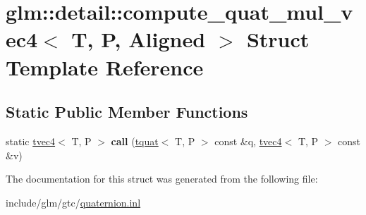 \hypertarget{structglm_1_1detail_1_1compute__quat__mul__vec4}{}\section{glm\+:\+:detail\+:\+:compute\+\_\+quat\+\_\+mul\+\_\+vec4$<$ T, P, Aligned $>$ Struct Template Reference}
\label{structglm_1_1detail_1_1compute__quat__mul__vec4}
\subsection*{Static Public Member Functions}
\begin{DoxyCompactItemize}
\item 
\mbox{\label{structglm_1_1detail_1_1compute__quat__mul__vec4_a38e75c5b7f8f3e588ba90a46b432ac0c}} 
static \hyperlink{structglm_1_1tvec4}{tvec4}$<$ T, P $>$ {\bfseries call} (\hyperlink{structglm_1_1tquat}{tquat}$<$ T, P $>$ const \&q, \hyperlink{structglm_1_1tvec4}{tvec4}$<$ T, P $>$ const \&v)
\end{DoxyCompactItemize}


The documentation for this struct was generated from the following file\+:\begin{DoxyCompactItemize}
\item 
include/glm/gtc/\hyperlink{gtc_2quaternion_8inl}{quaternion.\+inl}\end{DoxyCompactItemize}
